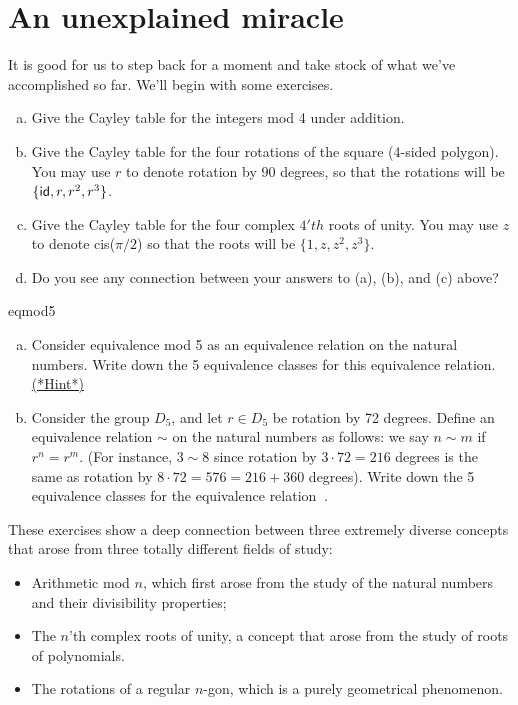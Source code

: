 \section{An unexplained miracle}\label{sec:miracle}

It is good for us to step back for a moment and take stock of what we've accomplished so far. We'll begin with some exercises.

\begin{exercise}{46}
\begin{enumerate}[(a)]
\item
Give the Cayley table for the integers mod 4 under addition.
\item 
Give the Cayley table for the four rotations of the square (4-sided polygon).  You may use $r$ to denote rotation by $90$ degrees, so that the rotations will be $\{ {\sf{i}d}, r, r^2, r^3  \}$.
\item 
Give the Cayley table for the four complex $4'{th}$ roots of unity. You may use $z$ to denote cis($\pi / 2$) so that the roots will be $\{ 1, z, z^2, z^3 \}$.
\item
Do you see any connection between your answers to (a), (b), and (c) above?
\end{enumerate}
\end{exercise}

\begin{exercise}{eqmod5}
\begin{enumerate}[(a)]
\item
Consider equivalence mod 5 as an equivalence relation on the natural numbers. Write down the 5 equivalence classes for this equivalence relation.
\hyperref[sec:symmetries:hints]{(*Hint*)}
\item
Consider the group $D_5$, and let $r \in D_5$ be rotation by 72 degrees. Define an equivalence relation $\sim$ on the natural numbers as follows: we say $n\sim m$ if $r^n = r^m$. (For instance, $3 \sim 8$ since rotation by $3 \cdot 72 = 216$ degrees is the same as rotation by $8 \cdot 72 = 576 = 216 + 360$ degrees). Write down the 5 equivalence classes for the equivalence relation $~$.
\end{enumerate}
\end{exercise}
\medskip

These exercises show a deep connection between three extremely diverse concepts that arose from three totally different fields of study:
\begin{itemize}
\item
Arithmetic mod $n$, which first arose from the study of the natural numbers and their divisibility properties;
\item
The $n$’th complex roots of unity, a concept that arose from the study of roots of polynomials.
\item
The rotations of a regular $n$-gon, which is a purely geometrical phenomenon.
\end{itemize}

